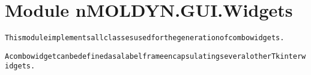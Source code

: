 %
%
%


\section{Module nMOLDYN.GUI.Widgets}

    \label{nMOLDYN:GUI:Widgets}
\begin{alltt}
This module implements all classes used for the generation of combo widgets. 

A combo widget can be defined as a label frame encapsulating several other Tkinter widgets.


\end{alltt}
